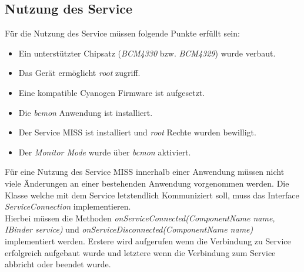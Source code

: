 \documentclass[]{report}
\begin{document}
\subsection{Nutzung des Service}\label{lab:usage}
Für die Nutzung des Service müssen folgende Punkte erfüllt sein:
\begin{itemize}
\item Ein unterstützter Chipsatz (\textit{BCM4330} bzw. \textit{BCM4329}) wurde verbaut.
\item Das Gerät ermöglicht \textit{root} zugriff.
\item Eine kompatible Cyanogen Firmware ist aufgesetzt.
\item Die \textit{bcmon} Anwendung ist installiert.
\item Der Service MISS ist installiert und \textit{root} Rechte wurden bewilligt.
\item Der \textit{Monitor Mode} wurde über \textit{bcmon} aktiviert.
\end{itemize}
Für eine Nutzung des Service MISS innerhalb einer Anwendung müssen nicht viele Änderungen an einer bestehenden Anwendung vorgenommen werden. Die Klasse welche mit dem Service letztendlich Kommuniziert soll, muss das Interface \textit{ServiceConnection} implementieren.\\
Hierbei müssen die Methoden \textit{onServiceConnected(ComponentName name, IBinder service)} und \textit{onServiceDisconnected(ComponentName name)} implementiert werden. Erstere wird aufgerufen wenn die Verbindung zu Service erfolgreich aufgebaut wurde und letztere wenn die Verbindung zum Service abbricht oder beendet wurde. \\
\end{document}
